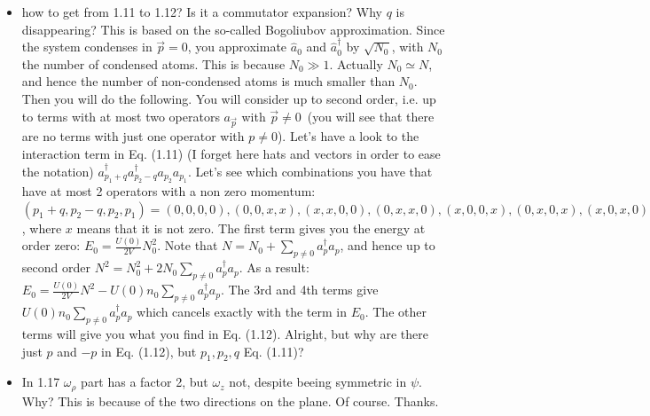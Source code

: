 \begin{itemize}
    \item how to get from 1.11 to 1.12? Is it a commutator expansion? Why $q$ is disappearing?
    {\color{red}
        This is based on the so-called Bogoliubov approximation. Since the system condenses in $\vec p=0$,
        you approximate $\hat a_0$ and $\hat a^\dag_0$ by $\sqrt{N_0}$,
        with $N_0$ the number of condensed atoms. This is because $N_0\gg 1$. Actually $N_0\simeq N$,
        and hence the number of non-condensed atoms is much smaller than $N_0$.
        Then you will do the following. You will consider up to second order,
        i.e. up to terms with at most two operators $a_{\vec p}$ with $\vec p\neq 0$~(you will see that there
        are no terms with just one operator with $p\neq 0$).
        Let's have a look to the interaction term in Eq. (1.11)
        (I forget here hats and vectors in order to ease the notation) $a^\dag_{p_1+q}a^\dag_{p_2-q}a_{p_2}a_{p_1}$.
        Let's see which combinations you have that have at most 2 operators with a non zero momentum:
        $(p_1+q,p_2-q,p_2,p_1)=(0,0,0,0), (0,0,x,x), (x,x,0,0), (0,x,x,0), (x,0,0,x), (0,x,0,x), (x,0,x,0)$,
        where $x$ means that it is not zero. The first term gives you the energy at order zero:
        $E_0=\frac{U(0)}{2V}N_0^2$.
        Note that $N=N_0+\sum_{p\neq 0} a^\dag_pa_p$, and hence up to second order $N^2=N_0^2+2N_0\sum_{p\neq 0} a^\dag_pa_p$.
        As a result:
        $E_0=\frac{U(0)}{2V}N^2 - U(0) n_0 \sum_{p\neq 0} a^\dag_pa_p$.
        The 3rd and 4th terms give $U(0) n_0 \sum_{p\neq 0} a^\dag_pa_p$ which cancels exactly with the term in $E_0$.
        The other terms will give you what you find in Eq. (1.12).
    }
    {\color{green}
        Alright, but why are there just $p$ and $-p$ in Eq. (1.12), but $p_{1}, p_{2}, q$ Eq. (1.11)?
    }

    \item In 1.17 $\omega_{\rho}$ part has a factor 2, but $\omega_{z}$ not, despite beeing symmetric in $\psi$. Why?
    {\color{red}
        This is because of the two directions on the plane.
    }
    {\color{green}
        Of course. Thanks.
    }


\end{itemize}

